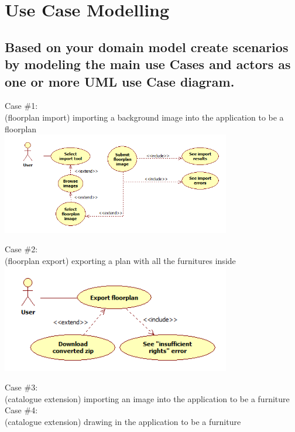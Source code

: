 \clearpage
\section{Use \noindent Case Modelling}
	
		\subsection{ Based on your domain model create scenarios by modeling the main use \noindent Cases
			and actors as one or more UML use \noindent Case diagram.}
		
			\noindent Case \#1:\\
			(floorplan import)
			importing a background image into the application to be a floorplan\\
			\includegraphics[width=0.75\textwidth]{images/UseCase1.png}
			
			
			\noindent Case \#2:\\
			(floorplan export)
			exporting a plan with all the furnitures inside\\
			\includegraphics[width=0.75\textwidth]{images/UseCase2.png}
			
			
			\noindent Case \#3:\\
			(catalogue extension)
			importing an image into the application to be a furniture\\
			
			
			\noindent Case \#4:\\
			(catalogue extension)
			drawing in the application to be a furniture\\
			
